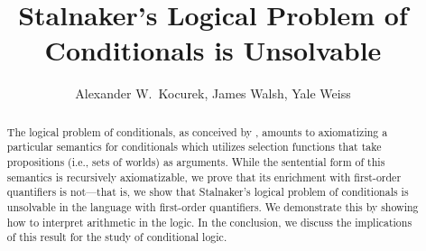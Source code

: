 \documentclass[12pt]{article}
\title{Stalnaker's Logical Problem of Conditionals is Unsolvable}
\author{Alexander W.\ Kocurek, James Walsh, Yale Weiss}
\date{}
\begin{document}
\maketitle

\begin{abstract}
    The logical problem of conditionals, as conceived by \cite{Stalnaker1968theory}, amounts to axiomatizing a particular semantics for conditionals which utilizes selection functions that take propositions (i.e., sets of worlds) as arguments. 
    While the sentential form of this semantics is recursively axiomatizable, we prove that its enrichment with first-order quantifiers is not---that is, we show that Stalnaker's logical problem of conditionals is unsolvable in the language with first-order quantifiers. 
    We demonstrate this by showing how to interpret arithmetic in the logic.
    In the conclusion, we discuss the implications of this result for the study of conditional logic.
    

\end{abstract}
\end{document}
